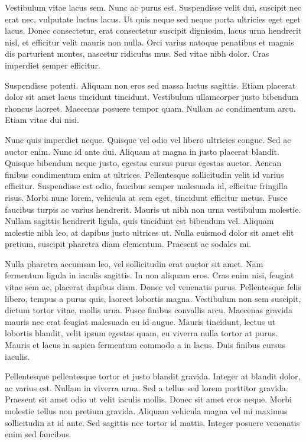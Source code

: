 Vestibulum vitae lacus sem. Nunc ac purus est. Suspendisse velit dui, suscipit nec erat nec, vulputate luctus lacus. Ut quis neque sed neque porta ultricies eget eget lacus. Donec consectetur, erat consectetur suscipit dignissim, lacus urna hendrerit nisl, et efficitur velit mauris non nulla. Orci varius natoque penatibus et magnis dis parturient montes, nascetur ridiculus mus. Sed vitae nibh dolor. Cras imperdiet semper efficitur.

Suspendisse potenti. Aliquam non eros sed massa luctus sagittis. Etiam placerat dolor sit amet lacus tincidunt tincidunt. Vestibulum ullamcorper justo bibendum rhoncus laoreet. Maecenas posuere tempor quam. Nullam ac condimentum arcu. Etiam vitae dui nisi.

Nunc quis imperdiet neque. Quisque vel odio vel libero ultricies congue. Sed ac auctor enim. Nunc id ante dui. Aliquam at magna in justo placerat blandit. Quisque bibendum neque justo, egestas cursus purus egestas auctor. Aenean finibus condimentum enim at ultrices. Pellentesque sollicitudin velit id varius efficitur. Suspendisse est odio, faucibus semper malesuada id, efficitur fringilla risus. Morbi nunc lorem, vehicula at sem eget, tincidunt efficitur metus. Fusce faucibus turpis ac varius hendrerit. Mauris ut nibh non urna vestibulum molestie. Nullam sagittis hendrerit ligula, quis tincidunt est bibendum vel. Aliquam molestie nibh leo, at dapibus justo ultrices ut. Nulla euismod dolor sit amet elit pretium, suscipit pharetra diam elementum. Praesent ac sodales mi.

Nulla pharetra accumsan leo, vel sollicitudin erat auctor sit amet. Nam fermentum ligula in iaculis sagittis. In non aliquam eros. Cras enim nisi, feugiat vitae sem ac, placerat dapibus diam. Donec vel venenatis purus. Pellentesque felis libero, tempus a purus quis, laoreet lobortis magna. Vestibulum non sem suscipit, dictum tortor vitae, mollis urna. Fusce finibus convallis arcu. Maecenas gravida mauris nec erat feugiat malesuada eu id augue. Mauris tincidunt, lectus ut lobortis blandit, velit ipsum egestas quam, eu viverra nulla tortor at purus. Mauris et lacus in sapien fermentum commodo a in lacus. Duis finibus cursus iaculis.

Pellentesque pellentesque tortor et justo blandit gravida. Integer at blandit dolor, ac varius est. Nullam in viverra urna. Sed a tellus sed lorem porttitor gravida. Praesent sit amet odio ut velit iaculis mollis. Donec sit amet eros neque. Morbi molestie tellus non pretium gravida. Aliquam vehicula magna vel mi maximus sollicitudin at id ante. Sed sagittis nec tortor id mattis. Integer posuere venenatis enim sed faucibus.

